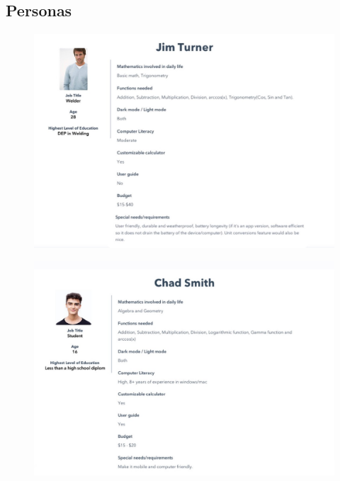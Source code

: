 \documentclass[titlepage]{article}
\begin{document}
        \subsection{Personas}
                \begin{figure}[!htb]
                    \centering
                    \includegraphics{images/Jim-Turner.JPG}
                \end{figure}
            \begin{figure}[!htb]
                \centering
                \includegraphics{images/Chad-Smith.JPG}
            \end{figure}
\end{document}

